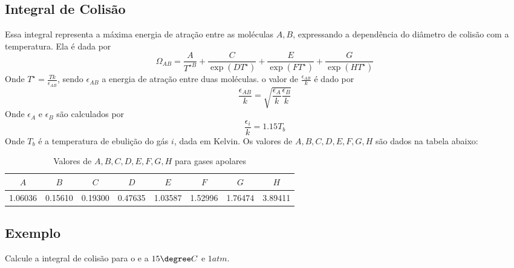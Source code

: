 \subsection{Integral de Colisão}
Essa integral representa a máxima energia de atração entre as moléculas \(A,B\), expressando a
dependência do diâmetro de colisão com a temperatura. Ela é dada por
\begin{equation}\label{eq:integral de colisão}
    \Omega_{AB} = \frac{A}{T^{\star B} } + \frac{C}{\exp \left( D T^{\star}  \right) } + \frac{E}{\exp \left( F T^{\star}  \right) } + \frac{G}{\exp \left(H T^{\star}\right) }
\end{equation}
Onde \(T^{\star} = \frac{Tk}{\epsilon_{AB}}\), sendo \(\epsilon_{AB}\) a energia de atração entre
duas moléculas. o valor de \(\frac{\epsilon_{AB}}{k} \) é dado por
\begin{equation}\label{eq:epsilon_AB}
    \frac{\epsilon_{AB}}{k} = \sqrt{\frac{\epsilon_{A}}{k} \frac{\epsilon_B}{k}}
\end{equation}
Onde \(\epsilon_A\) e \(\epsilon_B\) são calculados por
\begin{equation}\label{eq:energia de ativação indvidual}
    \frac{\epsilon_{i}}{k} = 1.15 T_{b} 
\end{equation}
Onde \(T_b\) é a temperatura de ebulição do gás \(i\), dada em Kelvin. Os valores de
\(A,B,C,D,E,F,G,H\) são dados na tabela abaixo:
\begin{table}[H]
    \centering
    \caption{Valores de \(A,B,C,D,E,F,G,H\) para gases apolares}
    \begin{tabular}{c|c|c|c|c|c|c|c}
        \toprule
        \(A\) & \(B\) & \(C\) & \(D\) & \(E\) & \(F\) & \(G\) & \(H\) \\
        \midrule
        1.06036 & 0.15610 & 0.19300 & 0.47635 & 1.03587 & 1.52996 & 1.76474 & 3.89411 \\
        \bottomrule
    \end{tabular}
\end{table}
\subsection{Exemplo}\label{ex:integral_colisao}
Calcule a integral de colisão para o  e  a \(15\degree C\) e \(1 atm\).
